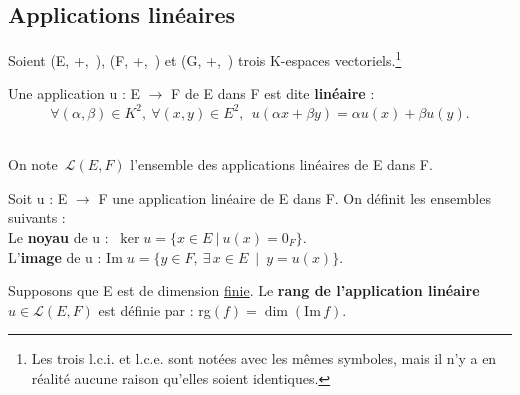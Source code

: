 \vspace{1.3cm}

\subsection{Applications linéaires}

\vspace{0.3cm}

\begin{center}
    Soient (E, +,\ \lce), (F, +,\ \lce) et (G, +,\ \lce) trois K-espaces vectoriels.\footnote{Les trois l.c.i. et l.c.e. sont notées avec les mêmes symboles, mais il n'y a en réalité aucune raison qu'elles soient identiques.}
\end{center}

\vspace{0.5cm}

\noindent Une application u : E \(\to\) F de E dans F est dite \textbf{linéaire} \ssi :\vspace{-0.3cm}\\
\[ \forall (\alpha, \beta)\in K^2,\ \forall(x,y)\in E^2,\ \ u(\alpha x+ \beta y)= \alpha u(x)+ \beta u(y). \] \vspace{-0.5cm} \\
\begin{small}
    On note $\,\mathscr{L}(E,F)$ l'ensemble des applications linéaires de E dans F.
\end{small}

\vspace{0.9cm}

Soit u : E \(\to\) F une application linéaire de E dans F. On définit les ensembles suivants : \\
Le \textbf{noyau} de u : \(\ \ker  u= \{ x\in E \ | \ u(x)=0_F\}. \) \vspace{0.1cm} \\
L'\textbf{image} de u :\hspace{0.34cm} Im\(\; u = \{y\in F,\ \exists\, x\in E \ \mid\ y=u(x) \}. \)

\vspace{1cm}

Supposons que E est de dimension \underline{finie}. Le \textbf{rang de l'application linéaire} \(u\in \mathscr{L}(E,F)\) est définie par : rg\((f)=\dim(\text{Im}\,f) \).

\vspace{1cm}


